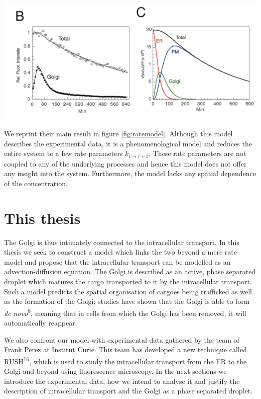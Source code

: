 \documentclass{Dissertate}
\let\origfigure\figure
\let\endorigfigure\endfigure
\renewenvironment{figure}[1][2] {
    \expandafter\origfigure\expandafter[H]
} {
    \endorigfigure
}
\begin{document}
\begin{figure}
\hypertarget{fig:ratemodel}{%
\centering
\includegraphics{source/figures/png/kineticmodel.png}
\caption{\textbf{Left panel}: First order rate model fitted to
experimental data by 15 \textbf{Right panel}: Inferred concentration in
ER, Golgi and PM using the fitted parameters from the left panel and
their model. Image reprinted from 15.}\label{fig:ratemodel}
}
\end{figure}

We reprint their main result in figure \ref{fig:ratemodel}.
Although this model describes the experimental data, it is a
phenomenological model and reduces the entire system to a few rate
parameters \(k_{i\to i+1}\). These rate parameters are not coupled to
any of the underlying processes and hence this model does not offer any
insight into the system. Furthermore, the model lacks any spatial
dependence of the concentration.

\hypertarget{this-thesis}{%
\section{This thesis}\label{this-thesis}}

The Golgi is thus intimately connected to the intracellular transport. In this thesis we seek to construct a model which links the two beyond a mere rate model and propose that the intracellular transport can be modelled as an advection-diffusion equation. The Golgi is described as an active, phase separated droplet which matures the cargo transported to it by the intracellular transport. Such a model predicts the spatial organisation of cargoes being trafficked as well as the formation of the Golgi; studies have shown that the Golgi is able to form \emph{de novo}\textsuperscript{8}, meaning that in cells from which the Golgi has been removed, it will automatically reappear.  

	We also confront our model with experimental data gathered by the team of Frank Perez at Institut Curie. This team has developed a new technique called RUSH\textsuperscript{16}, which is used to study the intracellular transport from the ER to the Golgi and
beyond using fluorescence microscopy. In the next sections we introduce the experimental data, how we intend to analyse it and justify
the description of intracellular transport and the Golgi as a phase separated droplet.
\end{document}
